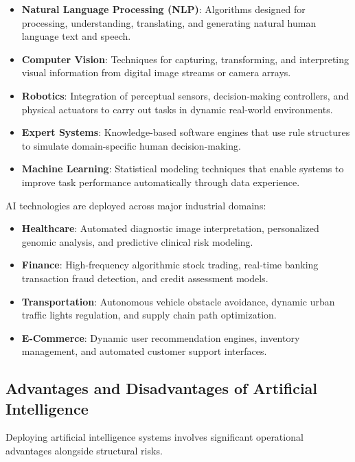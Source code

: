 \documentclass[12pt]{report}
\begin{document}
\begin{itemize}
    \item \textbf{Natural Language Processing (NLP)}: Algorithms designed for processing, understanding, translating, and generating natural human language text and speech.
    \item \textbf{Computer Vision}: Techniques for capturing, transforming, and interpreting visual information from digital image streams or camera arrays.
    \item \textbf{Robotics}: Integration of perceptual sensors, decision-making controllers, and physical actuators to carry out tasks in dynamic real-world environments.
    \item \textbf{Expert Systems}: Knowledge-based software engines that use rule structures to simulate domain-specific human decision-making.
    \item \textbf{Machine Learning}: Statistical modeling techniques that enable systems to improve task performance automatically through data experience.
\end{itemize}

AI technologies are deployed across major industrial domains:
\begin{itemize}
    \item \textbf{Healthcare}: Automated diagnostic image interpretation, personalized genomic analysis, and predictive clinical risk modeling.
    \item \textbf{Finance}: High-frequency algorithmic stock trading, real-time banking transaction fraud detection, and credit assessment models.
    \item \textbf{Transportation}: Autonomous vehicle obstacle avoidance, dynamic urban traffic lights regulation, and supply chain path optimization.
    \item \textbf{E-Commerce}: Dynamic user recommendation engines, inventory management, and automated customer support interfaces.
\end{itemize}

\subsection{Advantages and Disadvantages of Artificial Intelligence}

Deploying artificial intelligence systems involves significant operational advantages alongside structural risks.
\end{document}
